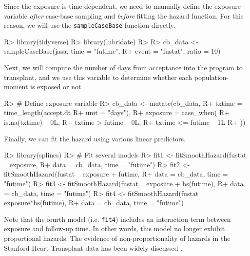 \documentclass[
]{jss}
\begin{document}
Since the exposure is time-dependent, we need to manually define the
exposure variable \emph{after} case-base sampling and \emph{before}
fitting the hazard function. For this reason, we will use the
\texttt{sampleCaseBase} function directly.

\begin{CodeChunk}

\begin{CodeInput}
R> library(tidyverse)
R> library(lubridate)
R> 
R> cb_data <- sampleCaseBase(jasa, time = "futime", 
R+                           event = "fustat", ratio = 10)
\end{CodeInput}
\end{CodeChunk}

Next, we will compute the number of days from acceptance into the
program to transplant, and we use this variable to determine whether
each population-moment is exposed or not.

\begin{CodeChunk}

\begin{CodeInput}
R> # Define exposure variable
R> cb_data <- mutate(cb_data,
R+                   txtime = time_length(accept.dt %
R+                                        unit = "days"),
R+                   exposure = case_when(
R+                     is.na(txtime) ~ 0L,
R+                     txtime > futime ~ 0L,
R+                     txtime <= futime ~ 1L
R+                   ))
\end{CodeInput}
\end{CodeChunk}

Finally, we can fit the hazard using various linear predictors.

\begin{CodeChunk}

\begin{CodeInput}
R> library(splines)
R> # Fit several models
R> fit1 <- fitSmoothHazard(fustat ~ exposure,
R+                         data = cb_data, time = "futime")
R> fit2 <- fitSmoothHazard(fustat ~ exposure + futime,
R+                         data = cb_data, time = "futime")
R> fit3 <- fitSmoothHazard(fustat ~ exposure + bs(futime),
R+                         data = cb_data, time = "futime")
R> fit4 <- fitSmoothHazard(fustat ~ exposure*bs(futime),
R+                         data = cb_data, time = "futime")
\end{CodeInput}
\end{CodeChunk}

Note that the fourth model (i.e. \texttt{fit4}) includes an interaction
term between exposure and follow-up time. In other words, this model no
longer exhibit proportional hazards. The evidence of non-proportionality
of hazards in the Stanford Heart Transplant data has been widely
discussed \citep{arjas1988graphical}.
\end{document}
